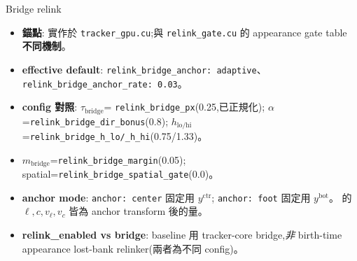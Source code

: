\begin{implsupp}{Bridge relink}
\begin{itemize}
\setlength\itemsep{1pt}
\item \textbf{錨點}: 實作於 \texttt{tracker\_gpu.cu};與
\texttt{relink\_gate.cu} 的 appearance gate table \textbf{不同機制}。
\item \textbf{effective default}: \texttt{relink\_bridge\_anchor: adaptive}、
\texttt{relink\_bridge\_anchor\_rate: 0.03}。
\item \textbf{config 對照}: \(\tau_{\mathrm{bridge}}\)=
\texttt{relink\_bridge\_px}(0.25,已正規化);
\(\alpha\)=\texttt{relink\_bridge\_dir\_bonus}(0.8);
\(h_{\mathrm{lo/hi}}\)=\texttt{relink\_bridge\_h\_lo/\_h\_hi}(0.75/1.33)。
\item \(m_{\mathrm{bridge}}\)=\texttt{relink\_bridge\_margin}(0.05);
spatial=\texttt{relink\_bridge\_spatial\_gate}(0.0)。
\item \textbf{anchor mode}: \texttt{anchor: center} 固定用 \(y^{\mathrm{ctr}}\);
\texttt{anchor: foot} 固定用 \(y^{\mathrm{bot}}\)。 的
\(\ell,c,v_\ell,v_c\) 皆為 anchor transform 後的量。
\item \textbf{relink\_enabled vs bridge}: baseline 用 tracker-core bridge,\emph{非}
birth-time appearance lost-bank relinker(兩者為不同 config)。
\end{itemize}
\end{implsupp}
